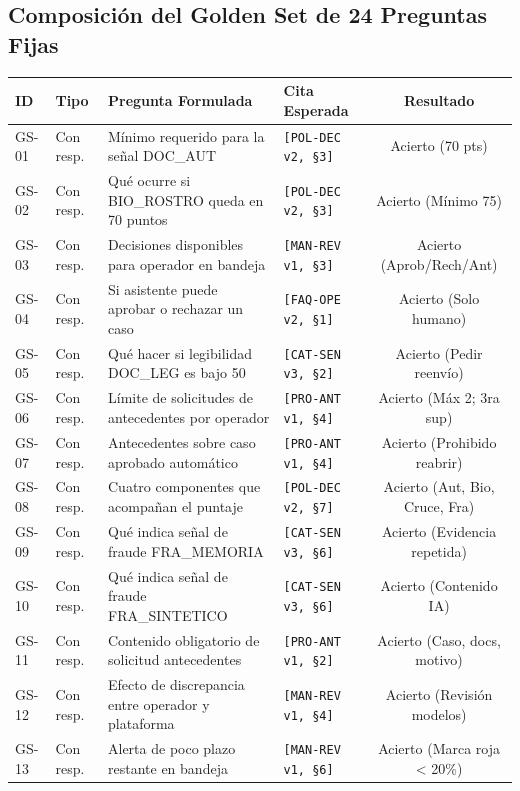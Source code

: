 \documentclass[11pt,letterpaper]{article}
\begin{document}
\subsection{Composición del Golden Set de 24 Preguntas Fijas}
\begin{table}[h!]
\footnotesize\centering
\begin{tabularx}{\textwidth}{llPYc}
\toprule
\textbf{ID} & \textbf{Tipo} & \textbf{Pregunta Formulada} & \textbf{Cita Esperada} & \textbf{Resultado} \\
\midrule
GS-01 & Con resp. & Mínimo requerido para la señal DOC\_AUT & \texttt{[POL-DEC v2, §3]} & Acierto (70 pts) \\
GS-02 & Con resp. & Qué ocurre si BIO\_ROSTRO queda en 70 puntos & \texttt{[POL-DEC v2, §3]} & Acierto (Mínimo 75) \\
GS-03 & Con resp. & Decisiones disponibles para operador en bandeja & \texttt{[MAN-REV v1, §3]} & Acierto (Aprob/Rech/Ant) \\
GS-04 & Con resp. & Si asistente puede aprobar o rechazar un caso & \texttt{[FAQ-OPE v2, §1]} & Acierto (Solo humano) \\
GS-05 & Con resp. & Qué hacer si legibilidad DOC\_LEG es bajo 50 & \texttt{[CAT-SEN v3, §2]} & Acierto (Pedir reenvío) \\
GS-06 & Con resp. & Límite de solicitudes de antecedentes por operador & \texttt{[PRO-ANT v1, §4]} & Acierto (Máx 2; 3ra sup) \\
GS-07 & Con resp. & Antecedentes sobre caso aprobado automático & \texttt{[PRO-ANT v1, §4]} & Acierto (Prohibido reabrir) \\
GS-08 & Con resp. & Cuatro componentes que acompañan el puntaje & \texttt{[POL-DEC v2, §7]} & Acierto (Aut, Bio, Cruce, Fra) \\
GS-09 & Con resp. & Qué indica señal de fraude FRA\_MEMORIA & \texttt{[CAT-SEN v3, §6]} & Acierto (Evidencia repetida) \\
GS-10 & Con resp. & Qué indica señal de fraude FRA\_SINTETICO & \texttt{[CAT-SEN v3, §6]} & Acierto (Contenido IA) \\
GS-11 & Con resp. & Contenido obligatorio de solicitud antecedentes & \texttt{[PRO-ANT v1, §2]} & Acierto (Caso, docs, motivo) \\
GS-12 & Con resp. & Efecto de discrepancia entre operador y plataforma & \texttt{[MAN-REV v1, §4]} & Acierto (Revisión modelos) \\
GS-13 & Con resp. & Alerta de poco plazo restante en bandeja & \texttt{[MAN-REV v1, §6]} & Acierto (Marca roja < 20\%) \\

\end{tabularx}
\end{table}
\end{document}
